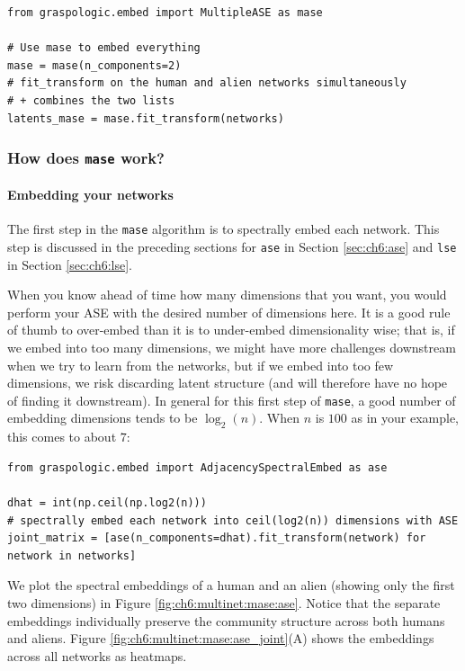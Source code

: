 \begin{lstlisting}[style=python]
from graspologic.embed import MultipleASE as mase

# Use mase to embed everything
mase = mase(n_components=2)
# fit_transform on the human and alien networks simultaneously
# + combines the two lists
latents_mase = mase.fit_transform(networks)
\end{lstlisting}

\subsubsection{How does \texttt{mase} work?}

\paragraph*{Embedding your networks}

The first step in the \texttt{mase} algorithm is to spectrally embed each network. This step is discussed in the preceding sections for \texttt{ase} in Section \ref{sec:ch6:ase} and \texttt{lse} in Section \ref{sec:ch6:lse}. 

When you know ahead of time how many dimensions that you want, you would perform your ASE with the desired number of dimensions here. It is a good rule of thumb to over-embed than it is to under-embed dimensionality wise; that is, if we embed into too many dimensions, we might have more challenges downstream when we try to learn from the networks, but if we embed into too few dimensions, we risk discarding latent structure (and will therefore have no hope of finding it downstream). In general for this first step of \texttt{mase}, a good number of embedding dimensions tends to be $\log_2(n)$. When $n$ is $100$ as in your example, this comes to about $7$:

\begin{lstlisting}[style=python]
from graspologic.embed import AdjacencySpectralEmbed as ase

dhat = int(np.ceil(np.log2(n)))
# spectrally embed each network into ceil(log2(n)) dimensions with ASE
joint_matrix = [ase(n_components=dhat).fit_transform(network) for network in networks]
\end{lstlisting}

We plot the spectral embeddings of a human and an alien (showing only the first two dimensions) in Figure \ref{fig:ch6:multinet:mase:ase}. Notice that the separate embeddings individually preserve the community structure across both humans and aliens. Figure \ref{fig:ch6:multinet:mase:ase_joint}(A) shows the embeddings across all networks as heatmaps.

